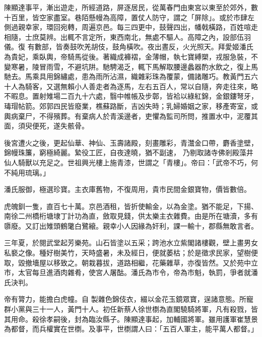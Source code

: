 \begin{pinyinscope}
 陳顯達事平，漸出遊走，所經道路，屏逐居民，從萬春門由東宮以東至於郊外，數十百里，皆空家盡室。巷陌懸幔為高障，置仗人防守，謂之「屏除」。或於市肆左側過親幸家，環回宛轉，周遍京邑。每三四更中，鼓聲四出，幡戟橫路，百姓喧走相隨，士庶莫辨。出輒不言定所，東西南北，無處不驅人。高障之內，設部伍羽儀。復
 有數部，皆奏鼓吹羌胡伎，鼓角橫吹。夜出晝反，火光照天。拜愛姬潘氏為貴妃，乘臥輿，帝騎馬從後。著織成褲褶，金薄帽，執七寶縛槊，戎服急裝，不變寒暑，陵冒雨雪，不避坑阱。馳騁渴乏，輒下馬解取腰邊蠡器酌水飲之，復上馬馳去。馬乘具用錦繡處，患為雨所沾濕，織雜彩珠為覆蒙，備諸雕巧。教黃門五六十人為騎客，又選無賴小人善走者為逐馬，左右五百人，常以自隨，奔走往來，略不暇息。置射雉場二百九十六處，翳中帷帳及步鄣，皆袷以綠紅錦，金銀鏤弩牙，瑇瑁帖箭。郊郭四民皆廢業，樵蘇路斷，吉凶失時；乳婦婚姻之家，移產寄室，或輿病棄尸，不得殯葬。有棄病人於青溪邊者，吏懼為監司所問，推置水中，泥覆其面，須臾便死，遂失骸骨。



 後宮遭火之後，更起仙華、神仙、玉壽諸殿，刻畫雕彩，青灊金口帶，麝香塗壁，錦幔珠簾，窮極綺麗。縶役工匠，自夜達曉，猶不副速，
 乃剔取諸寺佛剎殿藻井仙人騎獸以充足之。世祖興光樓上施青漆，世謂之「青樓」。帝曰：「武帝不巧，何不純用琉璃。」



 潘氏服御，極選珍寶。主衣庫舊物，不復周用，貴市民間金銀寶物，價皆數倍。



 虎魄釧一隻，直百七十萬。京邑酒租，皆折使輸金，以為金塗。猶不能足，下揚、南徐二州橋桁塘埭丁計功為直，斂取見錢，供太樂主衣雜費。由是所在塘瀆，多有隳廢。又訂出雉頭鶴氅白鷺縗。親幸小人因緣為奸利，課一輸十，郡縣無敢言者。



 三年夏，於閱武堂起芳樂苑。山石皆塗以五采；跨池水立紫閣諸樓觀，壁上畫男女私褻之像。種好樹美竹，天時盛暑，未及經日，便就萎枯；於是徵求民家，望樹便取，毀撤墻屋以移致之。朝栽暮拔，道路相繼，花藥雜草，亦復皆然。又於苑中立市，太官每旦進酒肉雜肴，使宮人屠酤。潘氏為市令，帝為市魁，執罰，爭者就潘氏決判。



 帝有膂力，能擔白虎幢。自
 製雜色錦伎衣，綴以金花玉鏡眾寶，逞諸意態。所寵群小黨與三十一人，黃門十人。初任新蔡人徐世檦為直閣驍騎將軍，凡有殺戮，皆其用命。殺徐孝嗣後，封為臨汝縣子。陳顯達事起，加輔國將軍。雖用護軍崔慧景為都督，而兵權實在世檦。及事平，世檦謂人曰：「五百人軍主，能平萬人都督。」




\end{pinyinscope}
